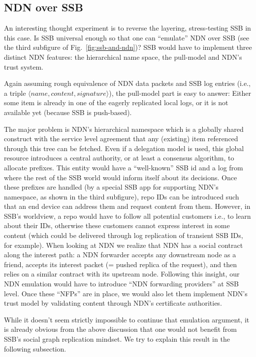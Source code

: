 \documentclass[10pt,sigconf,rewiew]{acmart}
\begin{document}
\subsection{NDN over SSB}
\label{ssect:ndn-over-ssb}

An interesting thought experiment is to reverse the layering,
stress-testing SSB in this case. Is SSB universal enough so that one
can ``emulate'' NDN over SSB (see the third subfigure of
Fig.~\ref{fig:ssb-and-ndn})? SSB would have to implement three
distinct NDN features: the hierarchical name space, the pull-model
and NDN's trust system.

Again assuming rough equivalence of NDN data packets and SSB log
entries (i.e., a triple $\langle name,content,signature\rangle$), the
pull-model part is easy to answer: Either some item is already in one
of the eagerly replicated local logs, or it is not available yet
(because SSB is push-based).

The major problem is NDN's hierarchical namespace which is a globally
shared construct with the service level agreement that any (existing)
item referenced through this tree can be fetched.  Even if a
delegation model is used, this global resource introduces a central
authority, or at least a consensus algorithm, to allocate
prefixes. This entity would have a ``well-known'' SSB id and a log
from where the rest of the SSB world would inform itself about its
decisions. Once these prefixes are handled (by a special SSB app for
supporting NDN's namespace, as shown in the third subfigure), repo IDs
can be introduced such that an end device can address them and request
content from them. However, in SSB's worldview, a repo would have to
follow all potential customers i.e., to learn about their IDs,
otherwise these customers cannot express interest in some content
(which could be delivered through log replication of transient SSB
IDs, for example). When looking at NDN we realize that NDN has a
social contract along the interest path: a NDN forwarder accepts any
downstream node as a friend, accepts its interest packet (= pushed
replica of the request), and then relies on a similar contract with
its upstream node. Following this insight, our NDN emulation would
have to introduce ``NDN forwarding providers'' at SSB level. Once
these ``NFPs'' are in place, we would also let them implement
NDN's trust model by validating content through NDN's certificate
authorities.

While it doesn't seem strictly impossible to continue that emulation
argument, it is already obvious from the above discussion that one
would not benefit from SSB's social graph replication mindset. We try
to explain this result in the following subsection.
\end{document}
